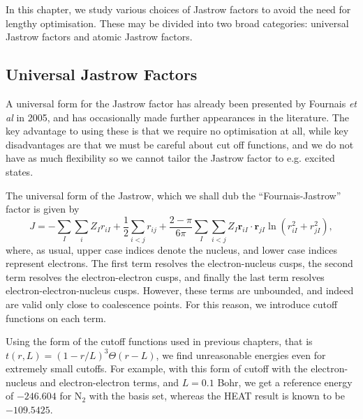 In this chapter, we study various choices of Jastrow factors to avoid the need for lengthy optimisation. These may be divided into two broad categories: universal Jastrow factors and atomic Jastrow factors.

\subsection{Universal Jastrow Factors}
\label{sec:universal-jastrow}
A universal form for the Jastrow factor has already been presented by Fournais \emph{et al} in 2005,\supercite{fournaisSharp2005} and has occasionally made further appearances in the literature.\supercite{tewSecond2008,szenesStriking2024} The key advantage to using these is that we require no optimisation at all, while key disadvantages are that we must be careful about cut off functions, and we do not have as much flexibility so we cannot tailor the Jastrow factor to e.g. excited states.

The universal form of the Jastrow, which we shall dub the ``Fournais-Jastrow'' factor is given by\supercite{fournaisSharp2005,fournaisNonIsotropic2007}
\begin{equation}
    \label{eq:fournais-full}
    J = -\sum_I\sum_i Z_Ir_{iI} + \frac 12\sum_{i<j}r_{ij} + \frac{2-\pi}{6\pi}\sum_I\sum_{i<j}Z_I\bm r_{iI}\cdot \bm r_{jI}\ln(r_{iI}^2+r_{jI}^2),
\end{equation}
where, as usual, upper case indices denote the nucleus, and lower case indices represent electrons. The first term resolves the electron-nucleus cusps, the second term resolves the electron-electron cusps, and finally the last term resolves electron-electron-nucleus cusps. However, these terms are unbounded, and indeed are valid only close to coalescence points. For this reason, we introduce cutoff functions on each term.

Using the form of the cutoff functions used in previous chapters, that is $t(r,L) = (1-r/L)^3\Theta(r-L)$, we find unreasonable energies even for extremely small cutoffs. For example, with this form of cutoff with the electron-nucleus and electron-electron terms, and $L=0.1$ Bohr, we get a reference energy of $-246.604$ for N$_2$ with the \avtz basis set, whereas the \gls{HEAT} result is known to be $-109.5425$.\supercite{fellerSurvey2008}

